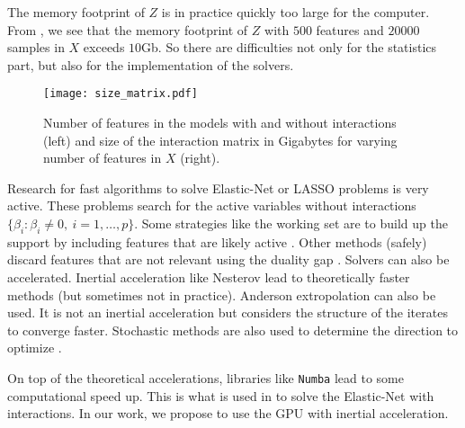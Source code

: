 \documentclass[../main.tex]{subfiles}
\begin{document}
\medskip

The memory footprint of $Z$ is in practice quickly too large for
the computer.
From , we see that the memory footprint of $Z$ with $500$
features and $20000$ samples in $X$ exceeds $10$Gb.
So there are difficulties not only for the statistics part, but also for
the implementation of the solvers.
 \begin{figure}[h!]
    \centering
    \texttt{[image: size\_matrix.pdf]}
    \caption{Number of features in the models with and without
    interactions (left) and size of the interaction matrix in Gigabytes for
    varying number of features in $X$ (right).}
    \label{fig:size_matrix}
\end{figure}

\medskip

Research for fast algorithms to solve Elastic-Net or LASSO problems is very
active.
These problems search for the active variables \ie without interactions
$\{\beta_i:\beta_i\neq 0,\ i=1,\dots,p\}.$
Some strategies like the working set are to build up the support by
including features that are likely active \citep{johnson2015blitz}.
Other methods (safely) discard features that are not relevant using the duality gap
\citep{ndiaye2017gap}.
Solvers can also be accelerated.
Inertial acceleration like Nesterov \citep{nesterov2012efficiency}
lead to theoretically faster methods (but sometimes not in practice).
Anderson extropolation \citep{bertrand2021anderson} can also be used.
It is not an inertial acceleration but considers the structure of the iterates to
converge faster.
Stochastic methods are also used to determine the direction to optimize
\citep{chen2021global}.

\medskip

On top of the theoretical accelerations, libraries like \texttt{Numba}
\citep{lam2015numba} lead to some computational speed up.
This is what is used in \citep{Bascou_Lebre_Salmon20} to solve the Elastic-Net
with interactions.
In our work, we propose to use the GPU with inertial acceleration.
\end{document}
